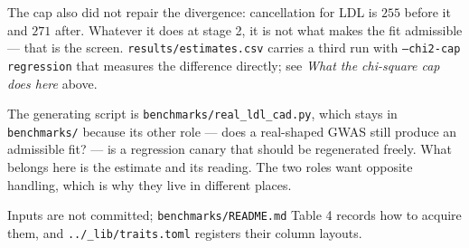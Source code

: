 The cap also did not repair the divergence: cancellation for LDL is $255$
before it and $271$ after. Whatever it does at stage 2, it is not what makes
the fit admissible --- that is the screen. \texttt{results/estimates.csv}
carries a third run with \texttt{--chi2-cap regression} that measures the difference
directly; see \emph{What the chi-square cap does here} above.

The generating script is \texttt{benchmarks/real\_ldl\_cad.py}, which stays in
\texttt{benchmarks/} because its other role --- does a real-shaped GWAS still
produce an admissible fit? --- is a regression canary that should be regenerated
freely. What belongs here is the estimate and its reading. The two roles want
opposite handling, which is why they live in different places.

Inputs are not committed; \texttt{benchmarks/README.md} Table 4 records how to
acquire them, and \texttt{../\_lib/traits.toml} registers their column layouts.
